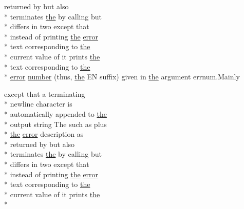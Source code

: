 \begin{DoxyCompactItemize}
returned by but also \\*
terminates \hyperlink{ClientServer_2server_2Makefile_a09c6b60bb7451f9136e25140ffdff6bd}{the} by calling but \\*
differs in two except that \\*
instead of printing \hyperlink{ClientServer_2server_2Makefile_a09c6b60bb7451f9136e25140ffdff6bd}{the} \hyperlink{common_2README_a80171b13188418b4328f9247d3aff3d2}{error} \\*
text corresponding to \hyperlink{ClientServer_2server_2Makefile_a09c6b60bb7451f9136e25140ffdff6bd}{the} \\*
current value of it prints \hyperlink{ClientServer_2server_2Makefile_a09c6b60bb7451f9136e25140ffdff6bd}{the} \\*
text corresponding to \hyperlink{ClientServer_2server_2Makefile_a09c6b60bb7451f9136e25140ffdff6bd}{the} \\*
\hyperlink{common_2README_a80171b13188418b4328f9247d3aff3d2}{error} \hyperlink{common_2README_aba79e3975c1b7da6e77c2f4b561603ae}{number} (thus, \hyperlink{ClientServer_2server_2Makefile_a09c6b60bb7451f9136e25140ffdff6bd}{the} E\-N suffix) given in \hyperlink{ClientServer_2server_2Makefile_a09c6b60bb7451f9136e25140ffdff6bd}{the} argument errnum.\-Mainly
\item 
except that a terminating \\*
newline character is \\*
automatically appended to \hyperlink{ClientServer_2server_2Makefile_a09c6b60bb7451f9136e25140ffdff6bd}{the} \\*
output string The such as plus \\*
\hyperlink{ClientServer_2server_2Makefile_a09c6b60bb7451f9136e25140ffdff6bd}{the} \hyperlink{common_2README_a80171b13188418b4328f9247d3aff3d2}{error} description as \\*
returned by but also \\*
terminates \hyperlink{ClientServer_2server_2Makefile_a09c6b60bb7451f9136e25140ffdff6bd}{the} by calling but \\*
differs in two except that \\*
instead of printing \hyperlink{ClientServer_2server_2Makefile_a09c6b60bb7451f9136e25140ffdff6bd}{the} \hyperlink{common_2README_a80171b13188418b4328f9247d3aff3d2}{error} \\*
text corresponding to \hyperlink{ClientServer_2server_2Makefile_a09c6b60bb7451f9136e25140ffdff6bd}{the} \\*
current value of it prints \hyperlink{ClientServer_2server_2Makefile_a09c6b60bb7451f9136e25140ffdff6bd}{the} \\*

\end{DoxyCompactItemize}
